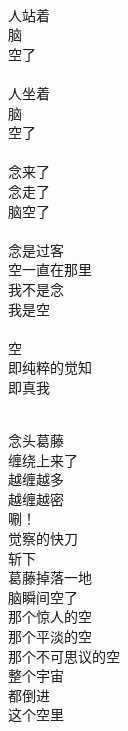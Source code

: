 \begin{poem}[空]
    \begin{multicols}{5}
        \centering~\\
        人站着 \\ 脑 \\ 空了\\~\\
        人坐着 \\ 脑 \\ 空了\\~\\
        念来了 \\ 念走了 \\ 脑空了 \\~\\
        念是过客 \\ 空一直在那里 \\ 我不是念 \\ 我是空\\~\\
        空 \\ 即纯粹的觉知 \\ 即真我
    \end{multicols}
\end{poem}

\begin{poem}[斩]
    \begin{multicols}{4}
        \centering~\\
        念头葛藤 \\ 缠绕上来了 \\ 越缠越多 \\ 越缠越密 \\ 唰！ \\ 觉察的快刀 \\ 斩下 \\ 葛藤掉落一地 \\ 脑瞬间空了 \\ 那个惊人的空 \\ 那个平淡的空 \\ 那个不可思议的空 \\ 整个宇宙 \\ 都倒进 \\ 这个空里
    \end{multicols}
\end{poem}

